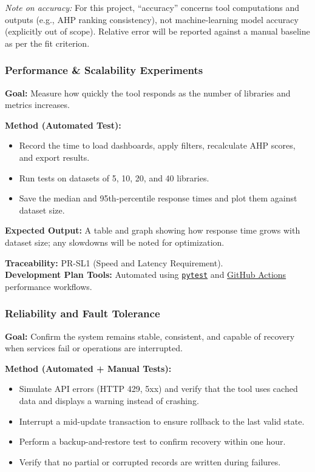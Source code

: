 \documentclass[12pt, titlepage]{article}
\begin{document}
\textit{Note on accuracy:} For this project, ``accuracy'' concerns tool computations and outputs (e.g., AHP ranking consistency), not machine-learning model accuracy (explicitly out of scope). Relative error will be reported against a manual baseline as per the fit criterion.

\subsubsection{Performance \& Scalability Experiments}
\label{subsubsec:performance}

\textbf{Goal:} Measure how quickly the tool responds as the number of libraries and metrics increases.

\textbf{Method (Automated Test):}
\begin{itemize}
  \item Record the time to load dashboards, apply filters, recalculate AHP scores, and export results.
  \item Run tests on datasets of 5, 10, 20, and 40 libraries.
  \item Save the median and 95th-percentile response times and plot them against dataset size.
\end{itemize}

\textbf{Expected Output:} A table and graph showing how response time grows with dataset size; any slowdowns will be noted for optimization.

\textbf{Traceability:} PR-SL1 (Speed and Latency Requirement).\\
\textbf{Development Plan Tools:} Automated using \texttt{\href{https://docs.pytest.org/en/stable/}{pytest}} and \href{https://github.com/thaafei/DomainX/actions}{GitHub Actions} performance workflows.

\subsubsection{Reliability and Fault Tolerance}
\label{subsubsec:reliability}

\textbf{Goal:} Confirm the system remains stable, consistent, and capable of recovery when services fail or operations are interrupted.

\textbf{Method (Automated + Manual Tests):}
\begin{itemize}
  \item Simulate API errors (HTTP 429, 5xx) and verify that the tool uses cached data and displays a warning instead of crashing.
  \item Interrupt a mid-update transaction to ensure rollback to the last valid state.
  \item Perform a backup-and-restore test to confirm recovery within one hour.
  \item Verify that no partial or corrupted records are written during failures.
\end{itemize}
\end{document}
